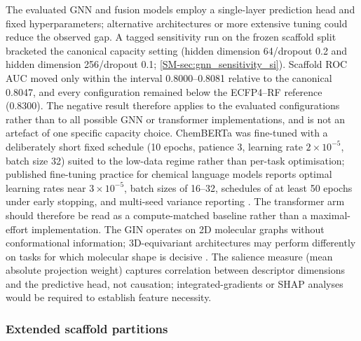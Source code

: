 \documentclass[11pt,a4paper]{article}
\begin{document}
The evaluated GNN and fusion models employ a single-layer prediction head and fixed hyperparameters; alternative architectures or more extensive tuning could reduce the observed gap. A tagged sensitivity run on the frozen scaffold split bracketed the canonical capacity setting (hidden dimension \num{64}/dropout \num{0.2} and hidden dimension \num{256}/dropout \num{0.1}; \cref{SM-sec:gnn_sensitivity_si}). Scaffold ROC AUC moved only within the interval \num{0.8000}--\num{0.8081} relative to the canonical \num{0.8047}, and every configuration remained below the ECFP4--RF reference (\num{0.8300}). The negative result therefore applies to the evaluated configurations rather than to all possible GNN or transformer implementations, and is not an artefact of one specific capacity choice. ChemBERTa was fine-tuned with a deliberately short fixed schedule (\num{10} epochs, patience \num{3}, learning rate $2\times 10^{-5}$, batch size \num{32}) suited to the low-data regime rather than per-task optimisation; published fine-tuning practice for chemical language models reports optimal learning rates near $3\times 10^{-5}$, batch sizes of \num{16}--\num{32}, schedules of at least \num{50} epochs under early stopping, and multi-seed variance reporting \citep{chemberta3_2026}. The transformer arm should therefore be read as a compute-matched baseline rather than a maximal-effort implementation. The GIN operates on 2D molecular graphs without conformational information; 3D-equivariant architectures may perform differently on tasks for which molecular shape is decisive \citep{rollins2024molprop}. The salience measure (mean absolute projection weight) captures correlation between descriptor dimensions and the predictive head, not causation; integrated-gradients or SHAP analyses would be required to establish feature necessity.

\subsubsection{Extended scaffold partitions}
\label{sec:extended-scaffold-partitions-ref}
\end{document}

